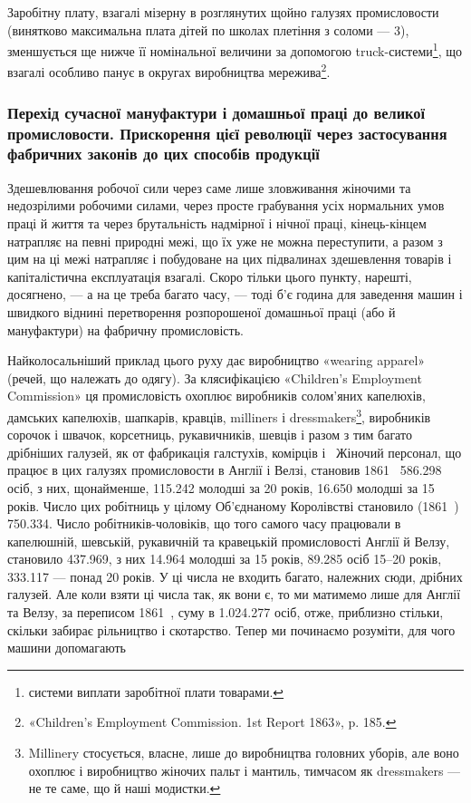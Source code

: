 
Заробітну плату, взагалі мізерну в розглянутих щойно галузях
промисловости (винятково максимальна плата дітей по школах
плетіння з соломи — 3), зменшується ще нижче її номінальної
величини за допомогою truck-системи\footnote*{
системи виплати заробітної плати товарами. 
}, що взагалі особливо панує в округах виробництва мережива\footnote{
«Children’s Employment Commission. 1st Report 1863», p. 185.
}.

\subsubsection{Перехід сучасної мануфактури і домашньої
праці до великої промисловости. Прискорення
цієї революції через застосування фабричних
законів до цих способів продукції}

Здешевлювання робочої сили через саме лише зловживання
жіночими та недозрілими робочими силами, через просте грабування
усіх нормальних умов праці й життя та через брутальність
надмірної і нічної праці, кінець-кінцем натрапляє на певні природні
межі, що їх уже не можна переступити, а разом з цим
на ці межі натрапляє і побудоване на цих підвалинах здешевлення
товарів і капіталістична експлуатація взагалі. Скоро тільки цього
пункту, нарешті, досягнено, — а на це треба багато часу, — тоді
б’є година для заведення машин і швидкого віднині перетворення
розпорошеної домашньої праці (або й мануфактури) на фабричну
промисловість.

Найколосальніший приклад цього руху дає виробництво «wearing
apparel» (речей, що належать до одягу). За клясифікацією
«\textenglish{Children’s Employment Commission}» ця промисловість охоплює
виробників солом’яних капелюхів, дамських капелюхів, шапкарів,
кравців, milliners і dressmakers\footnote{
Millinery стосується, власне, лише до виробництва головних уборів,
але воно охоплює і виробництво жіночих пальт і мантиль, тимчасом
як dressmakers — не те саме, що й наші модистки.
}, виробників сорочок і швачок,
корсетниць, рукавичників, шевців і разом з тим багато дрібніших
галузей, як от фабрикація галстухів, комірців і~ Жіночий
персонал, що працює в цих галузях промисловости в Англії і
Велзі, становив 1861~ \num{586.298} осіб, з них, щонайменше, \num{115.242}
молодші за 20 років, \num{16.650} молодші за 15 років. Число цих робітниць
у цілому Об’єднаному Королівстві становило (1861~)
\num{750.334}. Число робітників-чоловіків, що того самого часу працювали
в капелюшній, шевській, рукавичній та кравецькій промисловості
Англії й Велзу, становило \num{437.969}, з них \num{14.964} молодші
за 15 років, \num{89.285} осіб 15--20 років, \num{333.117} — понад 20 років.
У ці числа не входить багато, належних сюди, дрібних галузей.
Але коли взяти ці числа так, як вони є, то ми матимемо лише для
Англії та Велзу, за переписом 1861~, суму в \num{1.024.277} осіб,
отже, приблизно стільки, скільки забирає рільництво і скотарство.
Тепер ми починаємо розуміти, для чого машини допомагають
\parbreak{}  %
